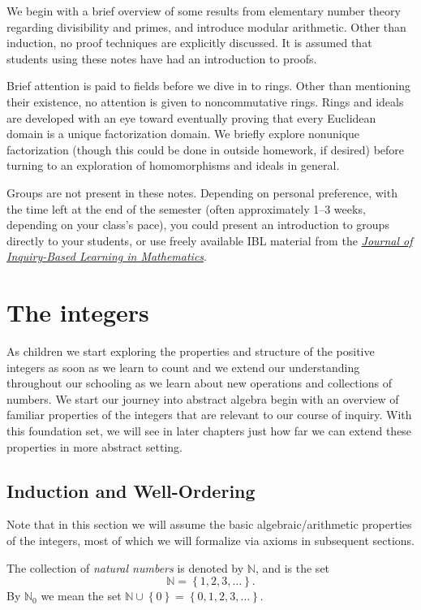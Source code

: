 \documentclass[english,course]{lecture}
\theoremstyle{plain}
\newenvironment{definition}[1]
  {\renewcommand\theinnerdefinition{#1}\innerdefinition}
  {\endinnerdefinition}
\def\set#1{\left\{ {#1} \right\}}
\def\N{{\mathbb N}}
\begin{document}
We begin with a brief overview of some results from elementary number theory regarding divisibility and primes, and introduce modular arithmetic. Other than induction, no proof techniques are explicitly discussed. It is assumed that students using these notes have had an introduction to proofs.

Brief attention is paid to fields before we dive in to rings. Other than mentioning their existence, no attention is given to noncommutative rings. Rings and ideals are developed with an eye toward eventually proving that every Euclidean domain is a unique factorization domain. We briefly explore nonunique factorization (though this could be done in outside homework, if desired) before turning to an exploration of homomorphisms and ideals in general.

Groups are not present in these notes. Depending on personal preference, with the time left at the end of the semester (often approximately 1--3 weeks, depending on your class's pace), you could present an introduction to groups directly to your students, or use freely available IBL material from the \href{http://jiblm.org/}{\emph{Journal of Inquiry-Based Learning in Mathematics}}.


\clearpage

\section{The integers}\label{sec:theintegers}


As children we start exploring the properties and structure of the positive integers as soon as we learn to count and we extend our understanding throughout our schooling as we learn about new operations and collections of numbers. We start our journey into abstract algebra begin with an overview of familiar properties of the integers that are relevant to our course of inquiry. With this foundation set, we will see in later chapters just how far we can extend these properties in more abstract setting.


\subsection{Induction and Well-Ordering}

Note that in this section we will assume the basic algebraic/arithmetic properties of the integers, most of which we will formalize via axioms in subsequent sections.

\begin{definition}\label{def:naturalnumbers}\index{$\N$}
	The collection of \emph{natural numbers} is denoted by $\N$, and is the set
	\[
		\N = \set{1, 2, 3, \ldots}.
	\]
	By $\N_0$ we mean the set $\N\cup \set{0} = \set{0, 1, 2, 3, \ldots}$.
\end{definition}
\end{document}
